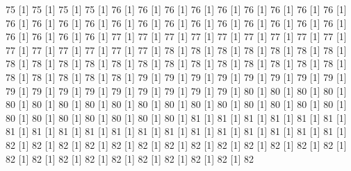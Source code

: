 \documentclass[12pt]{article}
\begin{document}
\begin{Schunk}
\begin{Soutput}
[1] 75%
[1] 75%
[1] 75%
[1] 75%
[1] 76%
[1] 76%
[1] 76%
[1] 76%
[1] 76%
[1] 76%
[1] 76%
[1] 76%
[1] 76%
[1] 76%
[1] 76%
[1] 76%
[1] 76%
[1] 76%
[1] 76%
[1] 76%
[1] 76%
[1] 76%
[1] 76%
[1] 76%
[1] 76%
[1] 76%
[1] 76%
[1] 76%
[1] 76%
[1] 76%
[1] 77%
[1] 77%
[1] 77%
[1] 77%
[1] 77%
[1] 77%
[1] 77%
[1] 77%
[1] 77%
[1] 77%
[1] 77%
[1] 77%
[1] 77%
[1] 77%
[1] 77%
[1] 78%
[1] 78%
[1] 78%
[1] 78%
[1] 78%
[1] 78%
[1] 78%
[1] 78%
[1] 78%
[1] 78%
[1] 78%
[1] 78%
[1] 78%
[1] 78%
[1] 78%
[1] 78%
[1] 78%
[1] 78%
[1] 78%
[1] 78%
[1] 78%
[1] 78%
[1] 78%
[1] 78%
[1] 78%
[1] 79%
[1] 79%
[1] 79%
[1] 79%
[1] 79%
[1] 79%
[1] 79%
[1] 79%
[1] 79%
[1] 79%
[1] 79%
[1] 79%
[1] 79%
[1] 79%
[1] 79%
[1] 79%
[1] 79%
[1] 80%
[1] 80%
[1] 80%
[1] 80%
[1] 80%
[1] 80%
[1] 80%
[1] 80%
[1] 80%
[1] 80%
[1] 80%
[1] 80%
[1] 80%
[1] 80%
[1] 80%
[1] 80%
[1] 80%
[1] 80%
[1] 80%
[1] 80%
[1] 80%
[1] 80%
[1] 80%
[1] 80%
[1] 81%
[1] 81%
[1] 81%
[1] 81%
[1] 81%
[1] 81%
[1] 81%
[1] 81%
[1] 81%
[1] 81%
[1] 81%
[1] 81%
[1] 81%
[1] 81%
[1] 81%
[1] 81%
[1] 81%
[1] 81%
[1] 81%
[1] 82%
[1] 82%
[1] 82%
[1] 82%
[1] 82%
[1] 82%
[1] 82%
[1] 82%
[1] 82%
[1] 82%
[1] 82%
[1] 82%
[1] 82%
[1] 82%
[1] 82%
[1] 82%
[1] 82%
[1] 82%
[1] 82%
[1] 82%
[1] 82%
[1] 82%
[1] 82%

\end{Soutput}
\end{Schunk}
\end{document}
